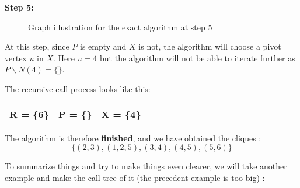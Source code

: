 \begin{minipage}{\linewidth}
    \textbf{Step 5:} \newline
    \begin{minipage}{0.4\textwidth}
        \begin{figure}[H]
            \centering
            \caption{Graph illustration for the exact algorithm at step 5}
            \label{fig:exact-mewc-step5}
        \end{figure}
    \end{minipage}
    \begin{minipage}{0.6\textwidth}
        At this step, since $P$ is empty and $X$ is not, the algorithm will
        choose a pivot vertex $u$ in $X$. Here $u = 4$ but the algorithm will
        not be able to iterate further as $P\backslash N(4) = \{\}$. \newline

        The recursive call process looks like this:
        \begin{center}
            \begin{tabular}{|lll|}
                \hline
                R = \{6\} & P = \{\} & X = \{4\} \\
                \hline
            \end{tabular}
        \end{center}
    \end{minipage}
\end{minipage} \newline

The algorithm is therefore \textbf{finished}, and we have obtained the cliques :
$$\{(2,3),(1,2,5),(3,4),(4,5),(5,6)\}$$

To summarize things and try to make things even clearer, we will take another example and make the call tree of it (the precedent example is too big) :

